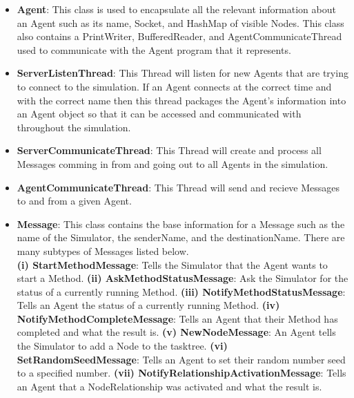 \begin{enumerate}
\begin{itemize}
\item \textbf{Agent}: This class is used to encapsulate all the relevant information about an Agent such as its name, Socket, and HashMap of visible Nodes. This class also contains a PrintWriter, BufferedReader, and AgentCommunicateThread used to communicate with the Agent program that it represents. \\

\item \textbf{ServerListenThread}: This Thread will listen for new Agents that are trying to connect to the simulation. If an Agent connects at the correct time and with the correct name then this thread packages the Agent's information into an Agent object so that it can be accessed and communicated with throughout the simulation. \\

\item \textbf{ServerCommunicateThread}: This Thread will create and process all Messages comming in from and going out to all Agents in the simulation. \\

\item \textbf{AgentCommunicateThread}: This Thread will send and recieve Messages to and from a given Agent. \\

\item \textbf{Message}: This class contains the base information for a Message such as the name of the Simulator, the senderName, and the destinationName. There are many subtypes of Messages listed below. \\

\subitem \textbf{(i) StartMethodMessage}: Tells the Simulator that the Agent wants to start a Method.
\subitem \textbf{(ii) AskMethodStatusMessage}: Ask the Simulator for the status of a currently running Method.
\subitem \textbf{(iii) NotifyMethodStatusMessage}: Tells an Agent the status of a currently running Method.
\subitem \textbf{(iv) NotifyMethodCompleteMessage}: Tells an Agent that their Method has completed and what the result is.
\subitem \textbf{(v) NewNodeMessage}: An Agent tells the Simulator to add a Node to the tasktree.
\subitem \textbf{(vi) SetRandomSeedMessage}: Tells an Agent to set their random number seed to a specified number.
\subitem \textbf{(vii) NotifyRelationshipActivationMessage}: Tells an Agent that a NodeRelationship was activated and what the result is. \\
\end{itemize}


\end{enumerate}
